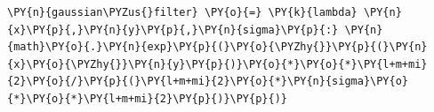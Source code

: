     \begin{tcolorbox}[breakable, size=fbox, boxrule=1pt, pad at break*=1mm,colback=cellbackground, colframe=cellborder]
\begin{Verbatim}[commandchars=\\\{\}]
\PY{n}{gaussian\PYZus{}filter} \PY{o}{=} \PY{k}{lambda} \PY{n}{x}\PY{p}{,}\PY{n}{y}\PY{p}{,}\PY{n}{sigma}\PY{p}{:} \PY{n}{math}\PY{o}{.}\PY{n}{exp}\PY{p}{(}\PY{o}{\PYZhy{}}\PY{p}{(}\PY{n}{x}\PY{o}{\PYZhy{}}\PY{n}{y}\PY{p}{)}\PY{o}{*}\PY{o}{*}\PY{l+m+mi}{2}\PY{o}{/}\PY{p}{(}\PY{l+m+mi}{2}\PY{o}{*}\PY{n}{sigma}\PY{o}{*}\PY{o}{*}\PY{l+m+mi}{2}\PY{p}{)}\PY{p}{)}
\end{Verbatim}
\end{tcolorbox}

